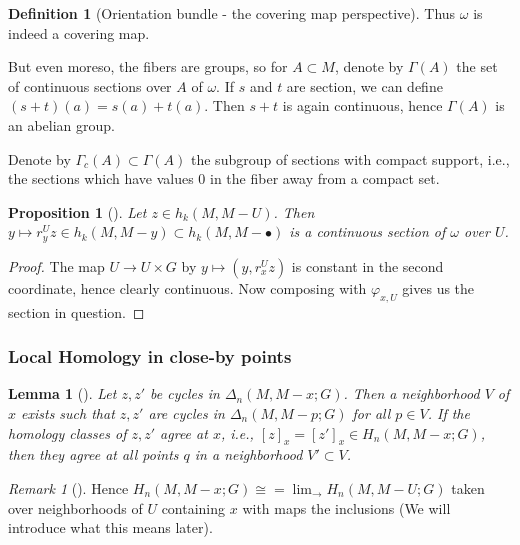 \documentclass[reqno]{amsart}
\newtheorem{lemma}[theorem]{Lemma}
\newtheorem{proposition}[theorem]{Proposition}
\theoremstyle{definition}
\newtheorem{definition}[theorem]{Definition}
\theoremstyle{remark}
\newtheorem*{remark}{Remark}
\begin{document}
\begin{definition}[Orientation bundle - the covering map perspective]
    Thus $\omega$ is indeed a covering map.

    But even moreso, the fibers are groups, so
    for $A \subset M$, denote by
    $\Gamma(A)$ the set of continuous
    sections over $A$ of
    $\omega$. If
    $s$ and $t$ are section, we can define
    $(s+t)(a) = s(a) + t(a)$. Then
    $s+t$ is again continuous, hence $\Gamma(A)$ is an
    abelian group.

    Denote by $\Gamma_c(A) \subset 
    \Gamma(A)$ the subgroup of sections
    with compact support, i.e., the sections
    which have values $0$ in the fiber away from
    a compact set.
\end{definition}

\begin{proposition}[]\label{Prop:DJIXOZ}
    Let $z \in h_k(M, M- U)$. Then
    $y \mapsto r_y^{U} z
    \in h_k(M, M-y) \subset 
    h_k(M, M - \bullet)$ is a continuous section of $\omega$
    over $U$.
\end{proposition}


\begin{proof}
    The map
    $U \to U \times G$ by
    $y \mapsto (y, r_x^{U}z)$ is constant in the second coordinate,
    hence clearly continuous. Now composing with
    $\varphi_{x,U}$ gives us the section in question.
\end{proof}




\subsubsection{Local Homology in close-by points}

\begin{lemma}[]\label{Lemma:XHJBIQ}
    Let $z, z'$ be cycles in $\Delta_n (M , M - x; G)$. Then
    a neighborhood $V$ of $x$ exists such that
    $z,z'$ are cycles in $\Delta_n \left( M, M - p; G \right) $ for 
    all $p \in V$. If the homology classes
    of $z,z'$ agree at $x$, i.e., $\left[ z \right]_x = 
    \left[ z' \right]_x \in H_n (M, M - x;G)$, then
    they agree at all points $q$ in a neighborhood
    $V' \subset V$.
\end{lemma}

\begin{remark}[]
    Hence $H_n (M, M-x;G) \cong = \lim_{\rightarrow}
    H_n (M, M- U;G)$ taken over neighborhoods
    of $U$ containing $x$ with maps the inclusions (We will
    introduce what this means later).
\end{remark}
\end{document}
